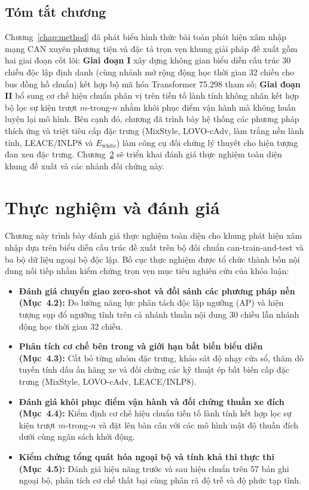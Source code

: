 \documentclass[12pt, a4paper, reqno, oneside]{book}
\begin{document}
\section{Tóm tắt chương}\label{sec:method-summary}
Chương~\ref{chap:method} đã phát biểu hình thức bài toán phát hiện xâm nhập mạng CAN xuyên phương tiện và đặc tả trọn vẹn khung giải pháp đề xuất gồm hai giai đoạn cốt lõi: \textbf{Giai đoạn I} xây dựng không gian biểu diễn cấu trúc 30 chiều độc lập định danh (cùng nhánh mở rộng động học thời gian 32 chiều cho bus đồng hồ chuẩn) kết hợp bộ mã hóa Transformer 75.298 tham số; \textbf{Giai đoạn II} bổ sung cơ chế hiệu chuẩn phân vị trên tiền tố lành tính không nhãn kết hợp bộ lọc sự kiện trượt $m$-trong-$n$ nhằm khôi phục điểm vận hành mà không huấn luyện lại mô hình. Bên cạnh đó, chương đã trình bày hệ thống các phương pháp thích ứng và triệt tiêu cấp đặc trưng (MixStyle, LOVO-cAdv, làm trắng nền lành tính, LEACE/INLP8 và $E_{\text{white}}$) làm công cụ đối chứng lý thuyết cho hiện tượng đan xen đặc trưng. Chương~\ref{chap:results} sẽ triển khai đánh giá thực nghiệm toàn diện khung đề xuất và các nhánh đối chứng này.

\chapter{Thực nghiệm và đánh giá}\label{chap:results}
Chương này trình bày đánh giá thực nghiệm toàn diện cho khung phát hiện xâm nhập dựa trên biểu diễn cấu trúc đề xuất trên bộ đối chuẩn can-train-and-test và ba bộ dữ liệu ngoại bộ độc lập. Bố cục thực nghiệm được tổ chức thành bốn nội dung nối tiếp nhằm kiểm chứng trọn vẹn mục tiêu nghiên cứu của khóa luận:
\begin{itemize}
    \item \textbf{Đánh giá chuyển giao zero-shot và đối sánh các phương pháp nền (Mục~4.2):} Đo lường năng lực phân tách độc lập ngưỡng (AP) và hiện tượng sụp đổ ngưỡng tĩnh trên cả nhánh thuần nội dung 30 chiều lẫn nhánh động học thời gian 32 chiều.
    \item \textbf{Phân tích cơ chế bên trong và giới hạn bất biến biểu diễn (Mục~4.3):} Cắt bỏ từng nhóm đặc trưng, khảo sát độ nhạy cửa sổ, thăm dò tuyến tính dấu ấn hãng xe và đối chứng các kỹ thuật ép bất biến cấp đặc trưng (MixStyle, LOVO-cAdv, LEACE/INLP8).
    \item \textbf{Đánh giá khôi phục điểm vận hành và đối chứng thuần xe đích (Mục~4.4):} Kiểm định cơ chế hiệu chuẩn tiền tố lành tính kết hợp lọc sự kiện trượt $m$-trong-$n$ và đặt lên bàn cân với các mô hình mật độ thuần đích dưới cùng ngân sách khởi động.
    \item \textbf{Kiểm chứng tổng quát hóa ngoại bộ và tính khả thi thực thi (Mục~4.5):} Đánh giá hiệu năng trước và sau hiệu chuẩn trên 57 bản ghi ngoại bộ, phân tích cơ chế thất bại cùng phân rã độ trễ và độ phức tạp tĩnh.
\end{itemize}
\end{document}

